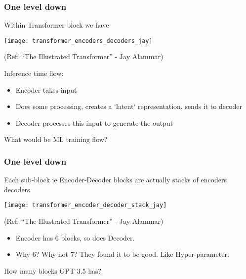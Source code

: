\begin{frame}[fragile]\frametitle{One level down}

Within Transformer block we have

\begin{center}
\texttt{[image: transformer\_encoders\_decoders\_jay]}

{\tiny (Ref: ``The Illustrated Transformer'' - Jay Alammar)}
\end{center}		

Inference time flow: 
\begin{itemize}
\item Encoder takes input
\item Does some processing, creates a `latent` representation, sends it to decoder
\item Decoder processes this input to generate the output
\end{itemize}

What would be ML training flow?
			
\end{frame}

\begin{frame}[fragile]\frametitle{One level down}

Each sub-block ie Encoder-Decoder blocks are actually stacks of encoders decoders.

\begin{center}
\texttt{[image: transformer\_encoder\_decoder\_stack\_jay]}

{\tiny (Ref: ``The Illustrated Transformer'' - Jay Alammar)}
\end{center}		

 
\begin{itemize}
\item Encoder has 6 blocks, so does Decoder. 
\item Why 6? Why not 7? They found it to be good. Like Hyper-parameter.
\end{itemize}

How many blocks GPT 3.5 has?
			
\end{frame}

